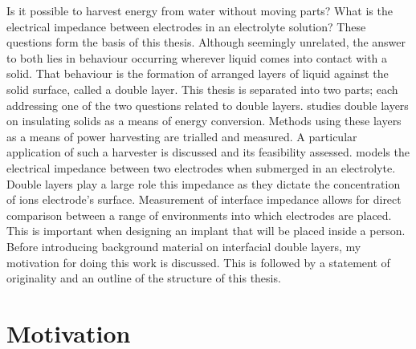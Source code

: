 



Is it possible to harvest energy from water without moving parts?
What is the electrical impedance between electrodes in an electrolyte solution?
These questions form the basis of this thesis.
Although seemingly unrelated, the answer to both lies in behaviour occurring wherever liquid comes into contact with a solid.
That behaviour is the formation of arranged layers of liquid against the solid surface, called a double layer.
This thesis is separated into two parts; each addressing one of the two questions related to double layers.
 studies double layers on insulating solids as a means of energy conversion.
Methods using these layers as a means of power harvesting are trialled and measured.
A particular application of such a harvester is discussed and its feasibility assessed.
 models the electrical impedance between two electrodes when submerged in an electrolyte.
Double layers play a large role this impedance as they dictate the concentration of ions electrode's surface.
Measurement of interface impedance allows for direct comparison between a range of environments into which electrodes are placed.
This is important when designing an implant that will be placed inside a person.
Before introducing background material on interfacial double layers, my motivation for doing this work is discussed.
This is followed by a statement of originality and an outline of the structure of this thesis.


\section{Motivation}
  \label{sect:introduction_motiviation}



